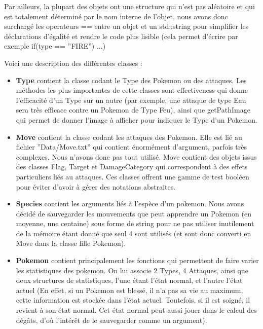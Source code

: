 \documentclass[a4paper,twoside, openany,11pt]{book}
\begin{document}
Par ailleurs, la plupart des objets ont une structure qui n'est pas aléatoire et qui est totalement déterminé par le nom interne de l'objet, nous avons donc surchargé les operateurs == entre un objet et un std::string pour simplifier les déclarations d'égalité et rendre le code plus lisible (cela permet d'écrire par exemple if(type == ''FIRE'') ...)

Voici une description des différentes classes :

\begin{itemize}
\item \textbf{Type} contient la classe codant le Type des Pokemon ou des attaques. Les méthodes les plus importantes de cette classes sont effectiveness qui donne l'efficacité d'un Type sur un autre (par exemple, une attaque de type Eau sera très efficace contre un Pokemon de Type Feu), ainsi que getPathImage qui permet de donner l'image à afficher pour indiquer le Type d'un Pokemon.
\item \textbf{Move} contient la classe codant les attaques des Pokemon. Elle est lié au fichier ''Data/Move.txt'' qui contient énormément d'argument, parfois très complexes. Nous n'avons donc pas tout utilisé. Move contient des objets issus des classes Flag, Target et DamageCategory qui correspondent à des effets particuliers liés au attaques. Ces classes offrent une gamme de test booléen pour éviter d'avoir à gérer des notations abstraites. 
\item  \textbf{Species} contient les arguments liés à l'espèce d'un pokemon. Nous avons décidé de sauvegarder les mouvements que peut apprendre un Pokemon (en moyenne, une centaine) sous forme de string pour ne pas utiliser inutilement de la mémoire étant donné que seul 4 sont utilisés (et sont donc converti en Move dans la classe fille Pokemon). 
\item  \textbf{Pokemon} contient principalement les fonctions qui permettent de faire varier les statistiques des pokemon. On lui associe 2 Types, 4 Attaques, ainsi que deux structures de statistiques, l'une étant l'état normal, et l'autre l'état actuel (En effet, si un Pokemon est blessé, il n'a pas sa vie au maximum, cette information est stockée dans l'état actuel. Toutefois, si il est soigné, il revient à son état normal. Cet état normal peut aussi jouer dans le calcul des dégâts, d'où l’intérêt de le sauvegarder comme un argument). 
\end{itemize}
\end{document}
